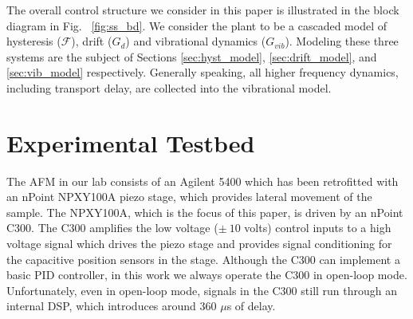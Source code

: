\documentclass[journal,twocolumn,twoside]{IEEEtran}
\begin{document}
The overall control structure we consider in this paper is illustrated in the block diagram in Fig. ~\ref{fig:ss_bd}. We consider the plant to be a cascaded model of hysteresis ($\mathcal{F}$),  drift ($G_d$) and vibrational dynamics ($G_{vib}$). Modeling these three systems are the subject of Sections \ref{sec:hyst_model}, \ref{sec:drift_model}, and \ref{sec:vib_model} respectively. Generally speaking, all higher frequency dynamics, including transport delay, are collected into the vibrational model.


\section{Experimental Testbed}\label{sec:testbed}
The AFM in our lab consists of an Agilent 5400 which has been retrofitted with an nPoint NPXY100A piezo stage, which provides lateral movement of the sample. The NPXY100A, which is the focus of this paper, is driven by an nPoint C300. The C300 amplifies the low voltage ($\pm~10$ volts) control inputs to a high voltage signal which drives the piezo stage and provides signal conditioning for the capacitive position sensors in the stage. Although the C300 can implement a basic PID controller, in this work we always operate the C300 in open-loop mode. Unfortunately, even in open-loop mode, signals in the C300 still run through an internal DSP, which introduces around 360 $\mu$s of delay. 
\end{document}
